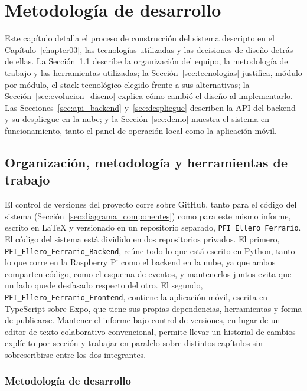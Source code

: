 \chapter{Metodología de desarrollo}\label{chapter04}

Este capítulo detalla el proceso de construcción del sistema descripto en el Capítulo~\ref{chapter03}, las tecnologías utilizadas y las decisiones de diseño detrás de ellas.
La Sección~\ref{sec:herramientas_metodologia} describe la organización del equipo, la metodología de trabajo y las herramientas utilizadas; la Sección~\ref{sec:tecnologias} justifica, módulo por módulo, el stack tecnológico elegido frente a sus alternativas; la Sección~\ref{sec:evolucion_diseno} explica cómo cambió el diseño al implementarlo.
Las Secciones~\ref{sec:api_backend} y~\ref{sec:despliegue} describen la API del backend y su despliegue en la nube; y la Sección~\ref{sec:demo} muestra el sistema en funcionamiento, tanto el panel de operación local como la aplicación móvil.

\section{Organización, metodología y herramientas de trabajo}
\label{sec:herramientas_metodologia}

El control de versiones del proyecto corre sobre GitHub, tanto para el código del sistema (Sección~\ref{sec:diagrama_componentes}) como para este mismo informe, escrito en LaTeX y versionado en un repositorio separado, \texttt{PFI\_Ellero\_Ferrario}.
El código del sistema está dividido en dos repositorios privados.
El primero, \texttt{PFI\_Ellero\_Ferrario\_Backend}, reúne todo lo que está escrito en Python, tanto lo que corre en la Raspberry Pi como el backend en la nube, ya que ambos comparten código, como el esquema de eventos, y mantenerlos juntos evita que un lado quede desfasado respecto del otro.
El segundo, \texttt{PFI\_Ellero\_Ferrario\_Frontend}, contiene la aplicación móvil, escrita en TypeScript sobre Expo, que tiene sus propias dependencias, herramientas y forma de publicarse.
Mantener el informe bajo control de versiones, en lugar de un editor de texto colaborativo convencional, permite llevar un historial de cambios explícito por sección y trabajar en paralelo sobre distintos capítulos sin sobrescribirse entre los dos integrantes.

\subsection*{Metodología de desarrollo}


